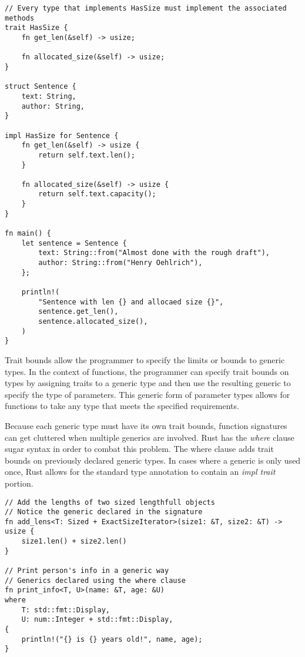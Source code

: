\documentclass[12pt]{article}
\begin{document}
\singlespacing{}
\begin{verbatim}
// Every type that implements HasSize must implement the associated methods
trait HasSize {
    fn get_len(&self) -> usize;

    fn allocated_size(&self) -> usize;
}

struct Sentence {
    text: String,
    author: String,
}

impl HasSize for Sentence {
    fn get_len(&self) -> usize {
        return self.text.len();
    }

    fn allocated_size(&self) -> usize {
        return self.text.capacity();
    }
}

fn main() {
    let sentence = Sentence {
        text: String::from("Almost done with the rough draft"),
        author: String::from("Henry Oehlrich"),
    };

    println!(
        "Sentence with len {} and allocaed size {}",
        sentence.get_len(),
        sentence.allocated_size(),
    )
}
\end{verbatim}
\doublespacing{}

Trait bounds allow the programmer to specify the limits or bounds to generic
types. In the context of functions, the programmer can specify trait bounds on
types by assigning traits to a generic type and then use the resulting generic
to specify the type of parameters. This generic form of parameter types allows
for functions to take any type that meets the specified requirements.

Because each generic type must have its own trait bounds, function signatures
can get cluttered when multiple generics are involved. Rust has the
\textit{where} clause sugar syntax in order to combat this problem. The where
clause adds trait bounds on previously declared generic types. In cases where a
generic is only used once, Rust allows for the standard type annotation to
contain an \textit{impl trait} portion.

\singlespacing{}
\begin{verbatim}
// Add the lengths of two sized lengthfull objects
// Notice the generic declared in the signature
fn add_lens<T: Sized + ExactSizeIterator>(size1: &T, size2: &T) -> usize {
    size1.len() + size2.len()
}

// Print person's info in a generic way
// Generics declared using the where clause
fn print_info<T, U>(name: &T, age: &U)
where
    T: std::fmt::Display,
    U: num::Integer + std::fmt::Display,
{
    println!("{} is {} years old!", name, age);
}
\end{verbatim}
\doublespacing{}

\makeworkscited{}
\end{document}
